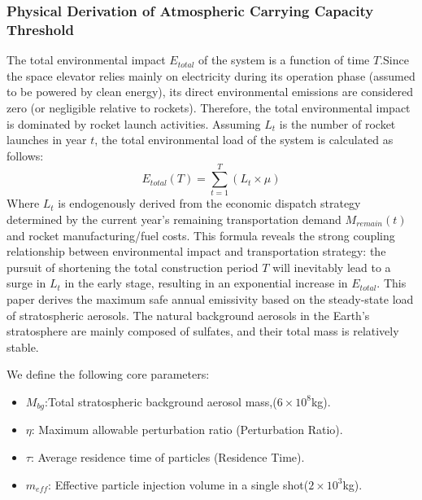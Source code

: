 \subsubsection{Physical Derivation of Atmospheric Carrying Capacity Threshold}
The total environmental impact $E_{total}$ of the system is a function of time $T$.Since the space elevator relies mainly on electricity during its operation phase (assumed to be powered by clean energy), its direct environmental emissions are considered zero (or negligible relative to rockets).
Therefore, the total environmental impact is dominated by rocket launch activities.
Assuming $L_t$ is the number of rocket launches in year $t$, the total environmental load of the system is calculated as follows:
\[E_{total}(T)=\sum_{t=1}^T(L_t\times\mu)\]
\indent Where $L_t$ is endogenously derived from the economic dispatch strategy determined by the current year’s remaining transportation demand $M_{remain}(t)$ and rocket manufacturing/fuel costs.
This formula reveals the strong coupling relationship between environmental impact and transportation strategy: the pursuit of shortening the total construction period $T$ will inevitably lead to a surge in $L_t$ in the early stage, resulting in an exponential increase in $E_{total}$.
This paper derives the maximum safe annual emissivity based on the steady-state load of stratospheric aerosols.
The natural background aerosols in the Earth's stratosphere are mainly composed of sulfates, and their total mass is relatively stable.

We define the following core parameters:
\begin{itemize}
\item $M_{bg}$:Total stratospheric background aerosol mass,($6 \times 10^8$kg).
\item $\eta $: Maximum allowable perturbation ratio (Perturbation Ratio).
\item $\tau $: Average residence time of particles (Residence Time).
\item $m_{eff}$: Effective particle injection volume in a single shot($2 \times 10^3$kg).
\end{itemize}
